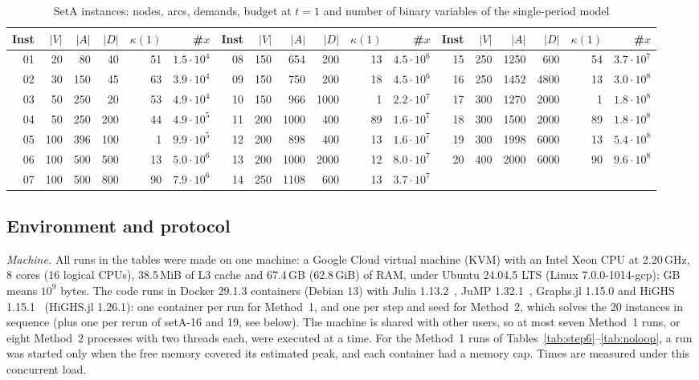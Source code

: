\documentclass[conference]{IEEEtran}
\begin{document}
\begin{table}[t]
\centering\footnotesize
\caption{SetA instances: nodes, arcs, demands, budget at $t=1$ and number of binary variables of the single-period model}\label{tab:inst}
\setlength{\tabcolsep}{4pt}
\begin{tabular}{@{}rrrrrr@{\qquad}rrrrrr@{\qquad}rrrrrr@{}}
\toprule
Inst & $|V|$ & $|A|$ & $|D|$ & $\kappa(1)$ & \#$x$ & Inst & $|V|$ & $|A|$ & $|D|$ & $\kappa(1)$ & \#$x$ & Inst & $|V|$ & $|A|$ & $|D|$ & $\kappa(1)$ & \#$x$\\
\midrule
01 & 20 & 80 & 40 & 51 & $1.5\cdot10^4$ & 08 & 150 & 654 & 200 & 13 & $4.5\cdot10^6$ & 15 & 250 & 1250 & 600 & 54 & $3.7\cdot10^7$\\
02 & 30 & 150 & 45 & 63 & $3.9\cdot10^4$ & 09 & 150 & 750 & 200 & 18 & $4.5\cdot10^6$ & 16 & 250 & 1452 & 4800 & 13 & $3.0\cdot10^8$\\
03 & 50 & 250 & 20 & 53 & $4.9\cdot10^4$ & 10 & 150 & 966 & 1000 & 1 & $2.2\cdot10^7$ & 17 & 300 & 1270 & 2000 & 1 & $1.8\cdot10^8$\\
04 & 50 & 250 & 200 & 44 & $4.9\cdot10^5$ & 11 & 200 & 1000 & 400 & 89 & $1.6\cdot10^7$ & 18 & 300 & 1500 & 2000 & 89 & $1.8\cdot10^8$\\
05 & 100 & 396 & 100 & 1 & $9.9\cdot10^5$ & 12 & 200 & 898 & 400 & 13 & $1.6\cdot10^7$ & 19 & 300 & 1998 & 6000 & 13 & $5.4\cdot10^8$\\
06 & 100 & 500 & 500 & 13 & $5.0\cdot10^6$ & 13 & 200 & 1000 & 2000 & 12 & $8.0\cdot10^7$ & 20 & 400 & 2000 & 6000 & 90 & $9.6\cdot10^8$\\
07 & 100 & 500 & 800 & 90 & $7.9\cdot10^6$ & 14 & 250 & 1108 & 600 & 13 & $3.7\cdot10^7$ & & & & & & \\
\bottomrule
\end{tabular}
\end{table}

\subsection{Environment and protocol}\label{sec:env}
\emph{Machine.} All runs in the tables were made on one machine: a Google Cloud virtual machine (KVM) with an Intel Xeon CPU at 2.20\,GHz, 8 cores (16 logical CPUs), 38.5\,MiB of L3 cache and 67.4\,GB (62.8\,GiB) of RAM, under Ubuntu 24.04.5 LTS (Linux 7.0.0-1014-gcp); GB means $10^9$ bytes. The code runs in Docker 29.1.3 containers (Debian 13) with Julia 1.13.2~\cite{julia}, JuMP 1.32.1~\cite{jump}, Graphs.jl 1.15.0 and HiGHS 1.15.1~\cite{highs} (HiGHS.jl 1.26.1): one container per run for Method~1, and one per step and seed for Method~2, which solves the 20 instances in sequence (plus one per rerun of setA-16 and 19, see below). The machine is shared with other users, so at most seven Method~1 runs, or eight Method~2 processes with two threads each, were executed at a time. For the Method~1 runs of Tables~\ref{tab:step6}--\ref{tab:noloop}, a run was started only when the free memory covered its estimated peak, and each container had a memory cap. Times are measured under this concurrent load.
\end{document}
